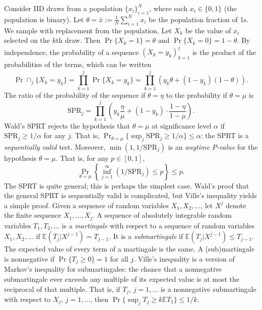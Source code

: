 \documentclass[12pt,runningheads]{llncs}
\newcommand{\EE}{\mathbb{E}}
\newcommand{\SPR}{\ensuremath{\mathrm{SPR}}}
\begin{document}
{Consider IID draws from a population $\{x_i\}_{i=1}^N$, where each $x_i \in \{0, 1\}$ (the population is binary).
Let $\theta = \bar{x} := \frac{1}{N} \sum_{i=1}^N x_i$ be the population fraction of 1s.
We sample with replacement from the population.
Let $X_k$ be the value of $x_i$ selected on the $k$th draw. 
Then $\Pr \{X_k = 1 \} = \theta$ and $\Pr \{X_k = 0 \} = 1-\theta$.
By independence, the probability of a sequence $(X_k=y_k)_{k=1}^j$ is the product of the probabilities of the terms,
which can be written 
\begin{equation}
\Pr \cap_j \{X_k = y_k \} = \prod_{k=1}^j \Pr \{X_k = y_k\} = \prod_{k=1}^j \left ( y_k \theta + (1-y_k)(1-\theta) \right ).
\end{equation}
The ratio of the probability of the sequence if $\theta = \eta$ to the probability if $\theta = \mu$ is
\begin{equation}
  \SPR_j = \prod_{k=1}^j \left ( y_k \frac{\eta}{\mu} + (1-y_k) \cdot \frac{1-\eta}{1-\mu} \right ).
\end{equation}
Wald's SPRT rejects the hypothesis that $\theta = \mu$ at significance level $\alpha$ if
$\SPR_j \ge 1/\alpha$ for any $j$.
That is, $\Pr_{\theta = \mu} \{\sup_j \SPR_j \ge 1/\alpha \} \le \alpha$: the SPRT is a \emph{sequentially valid} test.
Moreover, $\min(1, 1/\SPR_j)$ is an \emph{anytime $P$-value} for the hypothesis $\theta = \mu$.
That is, for any $p \in [0, 1]$, 
$$\Pr_{\theta = \mu}  \left \{\inf_{j=1}^\infty (1/\SPR_j) \le p \right \} \le p.$$
The SPRT is quite general; this is perhaps the simplest case.
Wald's proof that the general SPRT is sequentially valid is complicated, but Ville's inequality \cite{ville39} yields a simple proof.
Given a sequence of random variables $X_1, X_2, \ldots$, let $X^j$ denote the finite sequence $X_1, \ldots, X_j$.
A sequence of absolutely integrable random variables $T_1, T_2, \ldots$ is a \emph{martingale} with respect to a sequence of
random variables $X_1, X_2, \ldots$ if $\EE (T_j | X^{j-1}) = T_{j-1}$.
It is a \emph{submartingale} if $\EE (T_j | X^{j-1}) \le T_{j-1}$.
The expected value of every term of a martingale is the same.
A (sub)martingale is nonnegative if $\Pr \{T_j \ge 0 \} = 1$ for all $j$.
Ville's inequality is a version of Markov's inequality for submartingales:
the chance that a nonnegative submartingale ever exceeds any multiple of its expected value is at most the reciprocal of that multiple.
That is, if $T_j$, $j=1, \ldots$ is a nonnegative submartingale with respect to $X_j$, $j=1, \ldots$, then 
$\Pr \{ \sup_j T_j \ge k\EE T_1\} \le 1/k$.

}
\end{document}
